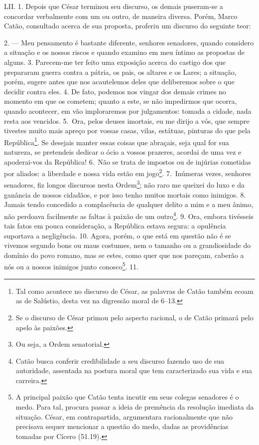 LII. 1. Depois que César terminou seu discurso, os demais puseram-se a concordar 
verbalmente com um ou outro, de maneira diversa. Porém, Marco Catão, consultado
acerca de sua proposta, proferiu um discurso do seguinte teor: 

2. --- Meu pensamento é bastante diferente, senhores senadores, quando considero a
situação e os nossos riscos e quando examino em meu íntimo as propostas de
alguns. 3. Parecem-me ter feito uma exposição acerca do castigo dos que
prepararam guerra contra a pátria, os pais, os altares e os Lares; a situação,
porém, sugere antes que nos acautelemos deles que deliberemos sobre o que
decidir contra eles. 4. De fato, podemos nos vingar dos demais crimes no
momento em que os cometem; quanto a este, se não impedirmos que ocorra, quando
acontecer, em vão imploraremos por julgamentos: tomada a cidade, nada resta aos
vencidos. 5.~Ora, pelos deuses imortais, eu me dirijo a vós, que sempre
tivestes muito mais apreço por vossas casas, vilas, estátuas, pinturas do que
pela República\footnote{Tal como acontece no discurso de César, as palavras de
Catão também ecoam as de Salústio, desta vez na digressão moral de 6--13.}. Se
desejais manter essas coisas que abraçais, seja qual for sua natureza, se
pretendeis dedicar o ócio a vossos prazeres, acordai de uma vez e apoderai-vos
da República! 6.~Não se trata de impostos ou de injúrias cometidas por aliados:
a liberdade e nossa vida estão em jogo\footnote{Se o discurso de César primou
pelo aspecto racional, o de Catão primará pelo apelo às paixões.}. 7.~Inúmeras
vezes, senhores senadores, fiz longos discursos nesta Ordem\footnote{Ou seja, a Ordem senatorial.}; não raro me
queixei do luxo e da ganância de nossos cidadãos, e por isso tenho muitos
mortais como inimigos. 8. Jamais tendo concedido a complacência de qualquer
delito a mim e a meu ânimo, não perdoava facilmente as faltas à paixão de um
outro\footnote{Catão busca conferir credibilidade a seu discurso fazendo uso de
sua autoridade, assentada na postura moral que tem caracterizado sua vida e sua
carreira.}. 9. Ora, embora tivésseis tais fatos em pouca consideração, a
República estava segura: a opulência suportava a negligência. 10. Agora, porém,
o que está em questão não é se vivemos segundo bons ou maus costumes, nem o tamanho
ou a grandiosidade do domínio do povo romano, mas se estes, como quer que nos
pareçam, caberão a nós ou a nossos inimigos junto conosco\footnote{A principal
paixão que Catão tenta incutir em seus colegas senadores é o medo. Para tal,
procura passar a ideia de premência da resolução imediata da situação. César,
em contrapartida, argumentara racionalmente que não precisava sequer mencionar
a questão do medo, dadas as providências tomadas por Cícero (51.19).}. 11.
